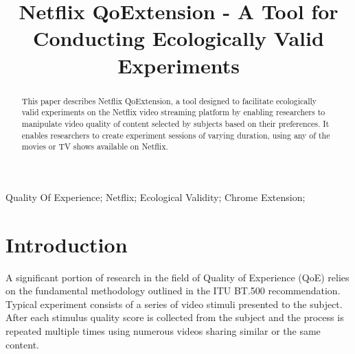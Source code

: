 \documentclass[conference]{IEEEtran}
\begin{document}
\title{Netflix QoExtension - A Tool for Conducting Ecologically Valid Experiments}

\author{




}
\maketitle

\begin{abstract}
This paper describes Netflix QoExtension, a tool designed to facilitate ecologically valid experiments on the Netflix video streaming platform by enabling researchers to manipulate video quality of content selected by subjects based on their preferences. It enables researchers to create experiment sessions of varying duration, using any of the movies or TV shows available on Netflix.
\end{abstract}

\begin{IEEEkeywords}
Quality Of Experience; Netflix; Ecological Validity; Chrome Extension;
\end{IEEEkeywords}

\section{Introduction}
\label{sec:Introduction}
A significant portion of research in the field of Quality of Experience (QoE) relies on the fundamental methodology outlined in the ITU BT.500 \cite{BT.500-14} recommendation. Typical experiment consists of a series of video stimuli presented to the subject. After each stimulus quality score is collected from the subject and the process is repeated multiple times using numerous videos sharing similar or the same content. 
\end{document}
